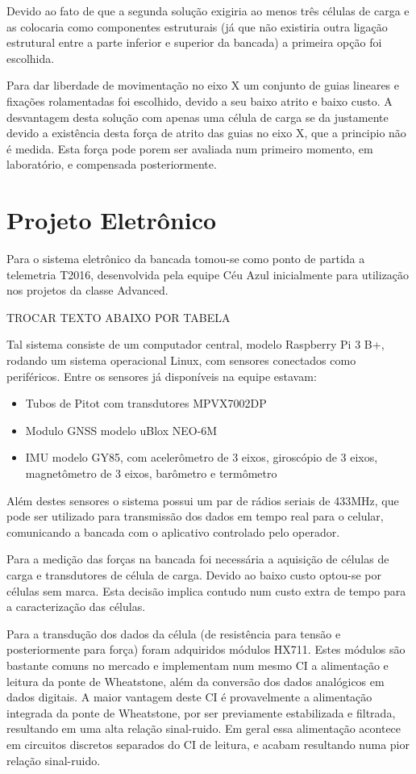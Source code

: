 Devido ao fato de que a segunda solução exigiria ao menos três células de carga e as colocaria como componentes estruturais (já que não existiria outra ligação estrutural entre a parte inferior e superior da bancada) a primeira opção foi escolhida.

Para dar liberdade de movimentação no eixo X um conjunto de guias lineares e fixações rolamentadas foi escolhido, devido a seu baixo atrito e baixo custo. A desvantagem desta solução com apenas uma célula de carga se da justamente devido a existência desta força de atrito das guias no eixo X, que a principio não é medida. Esta força pode porem ser avaliada num primeiro momento, em laboratório, e compensada posteriormente.
    
\section{Projeto Eletrônico}

Para o sistema eletrônico da bancada tomou-se como ponto de partida a telemetria T2016, desenvolvida pela equipe Céu Azul inicialmente para utilização nos projetos da classe Advanced.

TROCAR TEXTO ABAIXO POR TABELA

Tal sistema consiste de um computador central, modelo Raspberry Pi 3 B+, rodando um sistema operacional Linux, com sensores conectados como periféricos. Entre os sensores já disponíveis na equipe estavam:

\begin{itemize}
    \item Tubos de Pitot com transdutores MPVX7002DP
    \item Modulo GNSS modelo uBlox NEO-6M
    \item IMU modelo GY85, com acelerômetro de 3 eixos, giroscópio de 3 eixos, magnetômetro de 3 eixos, barômetro e termômetro
\end{itemize}

Além destes sensores o sistema possui um par de rádios seriais de 433MHz, que pode ser utilizado para transmissão dos dados em tempo real para o celular, comunicando a bancada com o aplicativo controlado pelo operador.

Para a medição das forças na bancada foi necessária a aquisição de células de carga e transdutores de célula de carga. Devido ao baixo custo optou-se por células sem marca. Esta decisão implica contudo num custo extra de tempo para a caracterização das células.

Para a transdução dos dados da célula (de resistência para tensão e posteriormente para força) foram adquiridos módulos HX711. Estes módulos são bastante comuns no mercado e implementam num mesmo CI a alimentação e leitura da ponte de Wheatstone, além da conversão dos dados analógicos em dados digitais. A maior vantagem deste CI é provavelmente a alimentação integrada da ponte de Wheatstone, por ser previamente estabilizada e filtrada, resultando em uma alta relação sinal-ruido. Em geral essa alimentação acontece em circuitos discretos separados do CI de leitura, e acabam resultando numa pior relação sinal-ruido.

